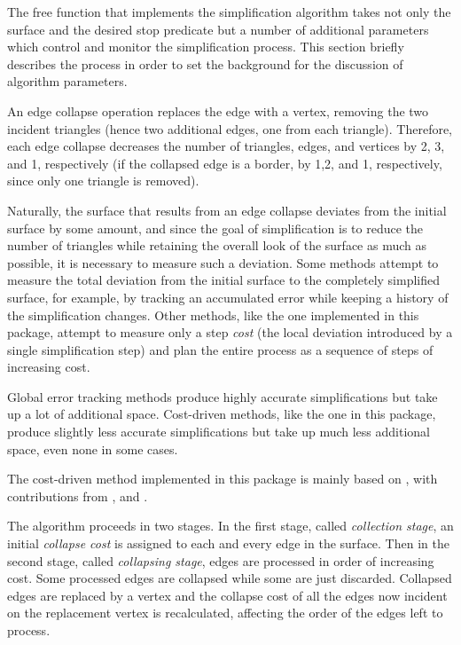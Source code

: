 The free function that implements the simplification algorithm takes not only the surface
and the desired stop predicate but a number of additional parameters which control and
monitor the simplification process. This section briefly describes the process in order 
to set the background for the discussion of algorithm parameters.

An edge collapse operation replaces the edge with a vertex, removing the two incident 
triangles (hence two additional edges, one from each triangle). Therefore, each edge collapse 
decreases the number of triangles, edges, and vertices by 2, 3, and 1, respectively 
(if the collapsed edge is a border, by 1,2, and 1, respectively, since only one triangle 
is removed).

Naturally, the surface that results from an edge collapse deviates from the initial 
surface by some amount, and since the goal of simplification is to reduce the number 
of triangles while retaining the overall look of the surface as much as possible, 
it is necessary to measure such a deviation. Some methods attempt to measure the 
total deviation from the initial surface to the completely simplified surface, 
for example, by tracking an accumulated error while keeping a history of the simplification 
changes. Other methods, like the one implemented in this package, attempt to measure only
a step {\em cost} (the local deviation introduced by a single simplification step) and 
plan the entire process as a sequence of steps of increasing cost. 

Global error tracking methods produce highly accurate simplifications but take up a lot 
of additional space. Cost-driven methods, like the one in this package, produce slightly 
less accurate simplifications but take up much less additional space, even none in some cases.

The cost-driven method implemented in this package is mainly based on \cite{cgal:lt-fmeps-98,cgal:lt-ems-99}, with contributions from \cite{hddms-mo-93}, \cite{gh-ssqem-97}
and \cite{degn-tpec-98}.

The algorithm proceeds in two stages. In the first stage, called {\em collection stage}, 
an initial {\em collapse cost} is assigned to each and every edge in the surface.
Then in the second stage, called {\em collapsing stage}, edges are 
processed in order of increasing cost. Some processed edges are collapsed 
while some are just discarded. Collapsed edges are replaced by a vertex and the collapse 
cost of all the edges now incident on the replacement vertex is recalculated, affecting 
the order of the edges left to process.


